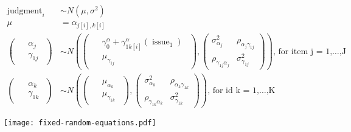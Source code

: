 \documentclass{article}
\begin{document}
$$
\begin{aligned}
  \operatorname{judgment}_{i}  &\sim N \left(\mu, \sigma^2 \right) \\
    \mu &=\alpha_{j[i],k[i]} \\    
\left(
  \begin{array}{c} 
    \begin{aligned}
      &\alpha_{j} \\
      &\gamma_{1j}
    \end{aligned}
  \end{array}
\right)
  &\sim N \left(
\left(
  \begin{array}{c} 
    \begin{aligned}
      &\gamma_{0}^{\alpha} + \gamma_{1k[i]}^{\alpha}(\operatorname{issue}_{\operatorname{1}}) \\
      &\mu_{\gamma_{1j}}
    \end{aligned}
  \end{array}
\right)
, 
\left(
  \begin{array}{cc}
     \sigma^2_{\alpha_{j}} & \rho_{\alpha_{j}\gamma_{1j}} \\ 
     \rho_{\gamma_{1j}\alpha_{j}} & \sigma^2_{\gamma_{1j}}
  \end{array}
\right)
 \right)
    \text{, for item j = 1,} \dots \text{,J} \\    
\left(
  \begin{array}{c} 
    \begin{aligned}
      &\alpha_{k} \\
      &\gamma_{1k}
    \end{aligned}
  \end{array}
\right)
  &\sim N \left(
\left(
  \begin{array}{c} 
    \begin{aligned}
      &\mu_{\alpha_{k}} \\
      &\mu_{\gamma_{1k}}
    \end{aligned}
  \end{array}
\right)
, 
\left(
  \begin{array}{cc}
     \sigma^2_{\alpha_{k}} & \rho_{\alpha_{k}\gamma_{1k}} \\ 
     \rho_{\gamma_{1k}\alpha_{k}} & \sigma^2_{\gamma_{1k}}
  \end{array}
\right)
 \right)
    \text{, for id k = 1,} \dots \text{,K}
\end{aligned}
$$

\newpage

\texttt{[image: fixed-random-equations.pdf]}
\end{document}
